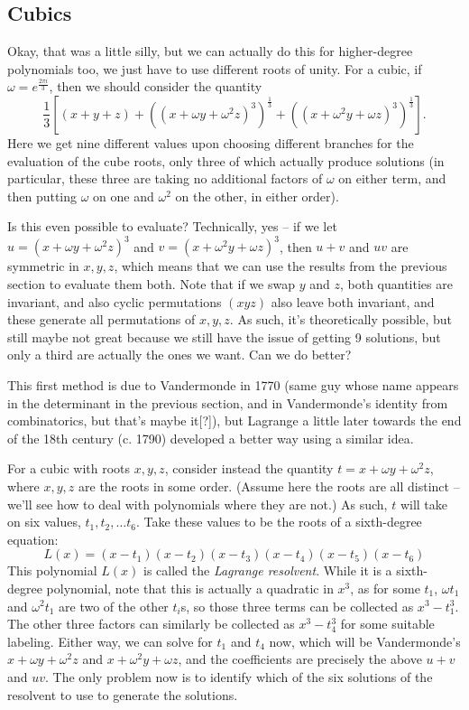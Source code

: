 \documentclass[12pt]{scrartcl}
\begin{document}
\subsection{Cubics}
Okay, that was a little silly, but we can actually do this for higher-degree polynomials too, we just have to use different roots of unity. For a cubic, if $\omega = e^{\frac{2\pi i}3}$, then we should consider the quantity
\[ \frac 13 [(x + y + z) + ((x + \omega y + \omega^2 z)^3)^{\frac 13} + ((x + \omega^2 y  + \omega z)^3)^{\frac 13}].\]
Here we get nine different values upon choosing different branches for the evaluation of the cube roots, only three of which actually produce solutions (in particular, these three are taking no additional factors of $\omega$ on either term, and then putting $\omega$ on one and $\omega^2$ on the other, in either order).

Is this even possible to evaluate? Technically, yes -- if we let $u = (x + \omega y + \omega^2 z)^3$ and $v = (x + \omega^2 y + \omega z)^3$, then $u+v$ and $uv$ are symmetric in $x, y, z$, which means that we can use the results from the previous section to evaluate them both. Note that if we swap $y$ and $z$, both quantities are invariant, and also cyclic permutations $(x y z)$ also leave both invariant, and these generate all permutations of $x, y, z$. As such, it's theoretically possible, but still maybe not great because we still have the issue of getting 9 solutions, but only a third are actually the ones we want. Can we do better?

This first method is due to Vandermonde in 1770 (same guy whose name appears in the determinant in the previous section, and in Vandermonde's identity from combinatorics, but that's maybe it[?]), but Lagrange a little later towards the end of the 18th century (c. 1790) developed a better way using a similar idea.

For a cubic with roots $x, y, z$, consider instead the quantity $t = x + \omega y + \omega^2 z$, where $x, y, z$ are the roots in some order. (Assume here the roots are all distinct -- we'll see how to deal with polynomials where they are not.) As such, $t$ will take on six values, $t_1, t_2, \dots t_6$. Take these values to be the roots of a sixth-degree equation: 
\[
    L(x) = (x - t_1) (x - t_2) (x - t_3) (x - t_4) (x - t_5) (x - t_6)
\]
This polynomial $L(x)$ is called the \textit{Lagrange resolvent}. While it is a sixth-degree polynomial, note that this is actually a quadratic in $x^3$, as for some $t_1$, $\omega t_1$ and $\omega^2 t_1$ are two of the other $t_i$s, so those three terms can be collected as $x^3 - t_1^3$. The other three factors can similarly be collected as $x^3 - t_4^3$ for some suitable labeling. Either way, we can solve for $t_1$ and $t_4$ now, which will be Vandermonde's $x + \omega y + \omega^2 z$ and $x + \omega^2 y + \omega z$, and the coefficients are precisely the above $u + v$ and $uv$. The only problem now is to identify which of the six solutions of the resolvent to use to generate the solutions. 
\end{document}
